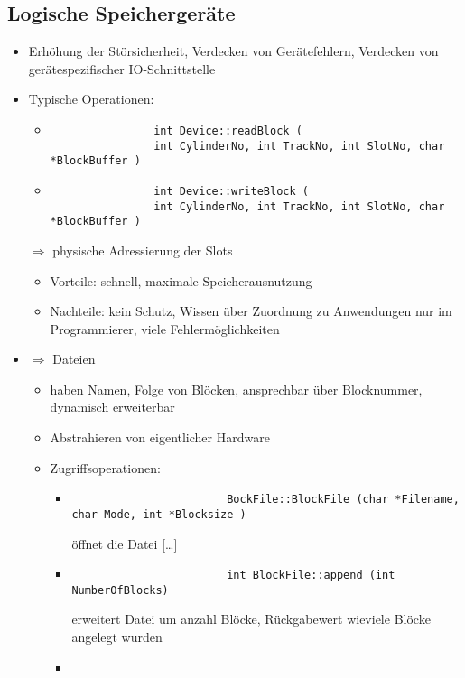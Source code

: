 \documentclass[a4paper, 12pt]{scrartcl}
\begin{document}
\subsection{Logische Speichergeräte}
\begin{itemize}
	\item
		Erhöhung der Störsicherheit, Verdecken von Gerätefehlern, Verdecken von gerätespezifischer IO-Schnittstelle
	\item
		Typische Operationen:
		\begin{itemize}
			\item
				\begin{lstlisting}
				int Device::readBlock (
				int CylinderNo, int TrackNo, int SlotNo, char *BlockBuffer )
				\end{lstlisting}
			\item
				\begin{lstlisting}
				int Device::writeBlock (
				int CylinderNo, int TrackNo, int SlotNo, char *BlockBuffer )
				\end{lstlisting}
		\end{itemize}
		$\Rightarrow$ physische Adressierung der Slots
		\begin{itemize}
			\item
				Vorteile: schnell, maximale Speicherausnutzung
			\item
				Nachteile: kein Schutz, Wissen über Zuordnung zu Anwendungen nur im Programmierer, viele Fehlermöglichkeiten
		\end{itemize}
	\item
		$\Rightarrow$ Dateien
		\begin{itemize}
			\item
				haben Namen, Folge von Blöcken, ansprechbar über Blocknummer, dynamisch erweiterbar
			\item Abstrahieren von eigentlicher Hardware
			\item
				Zugriffsoperationen:
				\begin{itemize}
					\item
						\begin{lstlisting}
						BockFile::BlockFile (char *Filename, char Mode, int *Blocksize )
						\end{lstlisting}
						öffnet die Datei [\dots]
					\item

						\begin{lstlisting}
						int BlockFile::append (int NumberOfBlocks)
						\end{lstlisting}
						erweitert Datei um anzahl Blöcke, Rückgabewert wieviele Blöcke angelegt wurden
					\item


\end{itemize}
\end{itemize}
\end{itemize}
\end{document}
